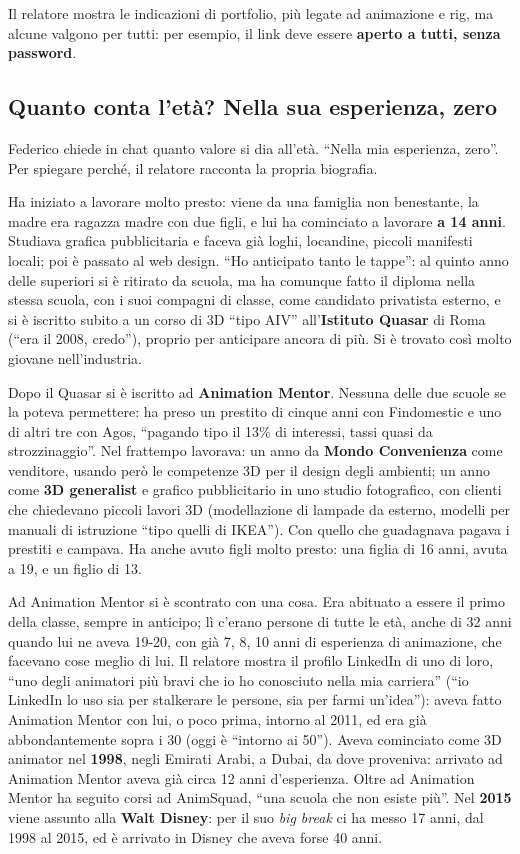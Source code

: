 Il relatore mostra le indicazioni di portfolio, più legate ad animazione e
rig, ma alcune valgono per tutti: per esempio, il link deve essere
\textbf{aperto a tutti, senza password}.

\subsection{Quanto conta l'età? Nella sua esperienza, zero}

Federico chiede in chat quanto valore si dia all'età. ``Nella mia esperienza,
zero''. Per spiegare perché, il relatore racconta la propria biografia.

Ha iniziato a lavorare molto presto: viene da una famiglia non benestante, la
madre era ragazza madre con due figli, e lui ha cominciato a lavorare
\textbf{a 14 anni}. Studiava grafica pubblicitaria e faceva già loghi,
locandine, piccoli manifesti locali; poi è passato al web design.
``Ho anticipato tanto le tappe'': al quinto anno delle superiori si è
ritirato da scuola, ma ha comunque fatto il diploma nella stessa scuola, con
i suoi compagni di classe, come candidato privatista esterno, e si è iscritto
subito a un corso di 3D ``tipo AIV'' all'\textbf{Istituto Quasar} di Roma
(``era il 2008, credo''), proprio per anticipare ancora di più. Si è trovato
così molto giovane nell'industria.

Dopo il Quasar si è iscritto ad \textbf{Animation Mentor}. Nessuna delle due
scuole se la poteva permettere: ha preso un prestito di cinque anni con
Findomestic e uno di altri tre con Agos, ``pagando tipo il 13\% di
interessi, tassi quasi da strozzinaggio''. Nel frattempo lavorava: un anno da
\textbf{Mondo Convenienza} come venditore, usando però le competenze 3D per
il design degli ambienti; un anno come \textbf{3D generalist} e grafico
pubblicitario in uno studio fotografico, con clienti che chiedevano piccoli
lavori 3D (modellazione di lampade da esterno, modelli per manuali di
istruzione ``tipo quelli di IKEA''). Con quello che guadagnava pagava i
prestiti e campava. Ha anche avuto figli molto presto: una figlia di 16 anni,
avuta a 19, e un figlio di 13.

Ad Animation Mentor si è scontrato con una cosa. Era abituato a essere il
primo della classe, sempre in anticipo; lì c'erano persone di tutte le età,
anche di 32 anni quando lui ne aveva 19-20, con già 7, 8, 10 anni di
esperienza di animazione, che facevano cose meglio di lui. Il relatore mostra
il profilo LinkedIn di uno di loro, ``uno degli animatori più bravi che io ho
conosciuto nella mia carriera'' (``io LinkedIn lo uso sia per stalkerare le
persone, sia per farmi un'idea''): aveva fatto Animation Mentor con lui, o
poco prima, intorno al 2011, ed era già abbondantemente sopra i 30 (oggi è
``intorno ai 50''). Aveva cominciato come 3D animator nel \textbf{1998}, negli
Emirati Arabi, a Dubai, da dove proveniva: arrivato ad Animation Mentor aveva
già circa 12 anni d'esperienza. Oltre ad Animation Mentor ha seguito corsi ad
AnimSquad, ``una scuola che non esiste più''. Nel \textbf{2015} viene assunto
alla \textbf{Walt Disney}: per il suo \emph{big break} ci ha messo 17 anni,
dal 1998 al 2015, ed è arrivato in Disney che aveva forse 40 anni.

